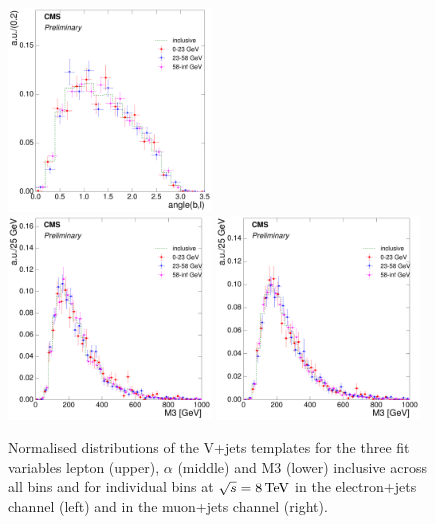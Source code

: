 \begin{figure}[hbtp]
     \includegraphics[width=0.48\textwidth]{Chapters/04_Analysis/04b_XSections/images/8TeV/fit_variables/muon/MT/angle_bl/vjets/MT_angle_bl_2orMoreBtags_VJets_template_comparison.pdf}\\
     \includegraphics[width=0.48\textwidth]{Chapters/04_Analysis/04b_XSections/images/8TeV/fit_variables/electron/MT/M3/vjets/MT_M3_2orMoreBtags_VJets_template_comparison.pdf}\hfill
     \includegraphics[width=0.48\textwidth]{Chapters/04_Analysis/04b_XSections/images/8TeV/fit_variables/muon/MT/M3/vjets/MT_M3_2orMoreBtags_VJets_template_comparison.pdf}\\
	 \caption[Normalised distributions of the V+jets templates for the three fit variables in \mt
	 bins at $\sqrt{s}=8\TeV$.]{Normalised distributions of the V+jets templates for the three fit variables
	 lepton \abseta (upper), $\alpha$ (middle) and M3 (lower) inclusive across all \mt bins and for individual
	 \mt bins at $\sqrt{s}=8\TeV$ in the electron+jets channel (left) and in the muon+jets channel (right).}
     \label{fig:MT_fit_variable_vjets_comparisons_8TeV}
\end{figure}

